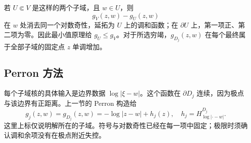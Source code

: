 \ProseParagraphBreak
若 \(U\Subset V\) 是这样的两个子域，且 \(w\in U\)，则
\[
 g_V(z,w)-g_U(z,w)
\]
在 \(w\) 处消去同一个对数奇性，延拓为 \(U\) 上的调和函数；在 \(\partial U\) 上，第一项正、第二项为零。因此最小值原理给 \(g_U\le g_V\)。对于所选穷竭，\(g_{D_j}(z,w)\) 在每个最终属于全部子域的固定点 \(z\) 单调增加。

\subsection{Perron 方法}
\label{b3:subsec:170302}

每个子域核的具体输入是边界数据 \(\log|\xi-w|\)。这个函数在 \(\partial D_j\) 连续，因为极点与该边界有正距离。上一节的 Perron 构造给
\[
 g_j(z,w)=g_{D_j}(z,w)=-\log|z-w|+h_j(z),
 \quad h_j=H^{D_j}_{\log|\cdot-w|}.
\]
这里上标仅说明解所在的子域。符号与对数奇性已经在每一项中固定；极限时须确认调和余项没有在极点附近失控。

